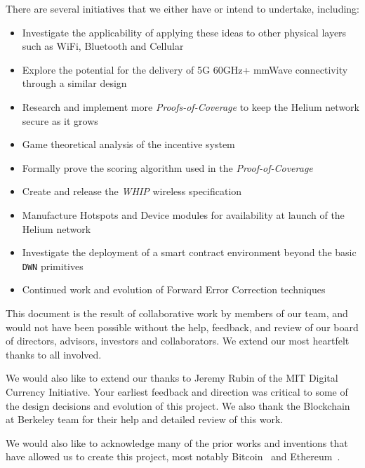 \documentclass[10pt, nonatbib, nocopyrightspace, reprint]{sigplanconf}
\begin{document}
There are several initiatives that we either have or intend to undertake, including:

\begin{itemize}
    \item Investigate the applicability of applying these ideas to other physical layers such as WiFi, Bluetooth and Cellular
    \item Explore the potential for the delivery of 5G 60GHz+ mmWave connectivity through a similar design
    \item Research and implement more \emph{Proofs-of-Coverage} to keep the Helium network secure as it grows
    \item Game theoretical analysis of the incentive system
    \item Formally prove the scoring algorithm used in the \emph{Proof-of-Coverage}
    \item Create and release the \emph{WHIP} wireless specification
    \item Manufacture Hotspots and Device modules for availability at launch of the Helium network
    \item Investigate the deployment of a smart contract environment beyond the basic \verb|DWN| primitives
    \item Continued work and evolution of Forward Error Correction techniques
\end{itemize}

\acks

This document is the result of collaborative work by members of our team, and would not have been possible without the help, feedback, and review of our board of directors, advisors, investors and collaborators. We extend our most heartfelt thanks to all involved.

We would also like to extend our thanks to Jeremy Rubin of the MIT Digital Currency Initiative. Your earliest feedback and direction was critical to some of the design decisions and evolution of this project. We also thank the Blockchain at Berkeley team for their help and detailed review of this work.

We would also like to acknowledge many of the prior works and inventions that have allowed us to create this project, most notably Bitcoin~\cite{bitcoin} and Ethereum~\cite{ethereum}.
\newpage
\end{document}
